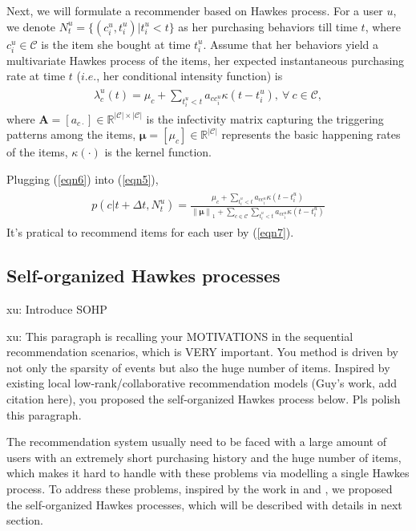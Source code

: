 \documentclass[runningheads]{llncs}
\newcommand{\xu}[1]{{\color{red} xu: #1}}
\begin{document}
Next, we will formulate a recommender based on Hawkes process.
For a user $u$, we denote $N_t^{u}=\{(c_i^u, t_i^u)| t_i^u<t\}$ as her purchasing behaviors till time $t$, where $c_i^u\in\mathcal{C}$ is the item she bought at time $t_i^u$. 
Assume that her behaviors yield a multivariate Hawkes process of the items, her expected instantaneous purchasing rate at time $t$ ($i.e.$, her conditional intensity function) is 
\begin{eqnarray}
\begin{aligned}
\lambda_{c}^u(t) = \mu_c + \sum_{t_i^u < t} a_{cc_i^u}\kappa(t- t_i^u),~\forall~c\in\mathcal{C}, \label{eqn6}
\end{aligned}    
\end{eqnarray}
where $\bm{A}=[a_{c\cdot}]\in\mathbb{R}^{|\mathcal{C}|\times |\mathcal{C}|}$ is the infectivity matrix capturing the triggering patterns among the items, $\bm{\mu}=[\mu_c]\in\mathbb{R}^{|\mathcal{C}|}$ represents the basic happening rates of the items, $\kappa(\cdot)$ is the kernel function. 

Plugging (\ref{eqn6}) into (\ref{eqn5}),
\begin{eqnarray}
\begin{aligned}
p(c| t+\Delta t, N_t^u) = \frac{\mu_c + \sum_{t_i^u < t} a_{cc_i^u}\kappa(t- t_i^u)}{\left\|\bm{\mu} \right\|_1 + \sum_{c \in \mathcal{C}} \sum_{t_i^u < t} a_{cc_i^u}\kappa(t- t_i^u)}\label{eqn7}
\end{aligned}    
\end{eqnarray}
It's pratical to recommend items for each user by (\ref{eqn7}).

\subsection{Self-organized Hawkes processes}
\xu{Introduce SOHP}

\xu{This paragraph is recalling your MOTIVATIONS in the sequential recommendation scenarios, which is VERY important. You method is driven by not only the sparsity of events but also the huge number of items. 
Inspired by existing local low-rank/collaborative recommendation models (Guy's work, add citation here), you proposed the self-organized Hawkes process below. Pls polish this paragraph.}

The recommendation system usually need to be faced with a large amount of users with an extremely short purchasing history and the huge number of items, which makes it hard to handle with these problems via modelling a single Hawkes process. To address these problems, inspired by the work in \cite{lee2013local} and \cite{lee2014local}, we proposed the self-organized Hawkes processes, which will be described with details in next section. 
\end{document}
